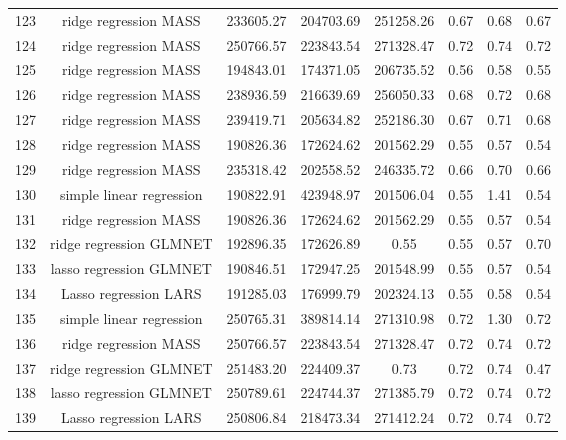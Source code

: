 \begin{tabular}{cccccccc}
  123 & ridge regression MASS & 233605.27 & 204703.69 & 251258.26 & 0.67 & 0.68 & 0.67 \\ 
  124 & ridge regression MASS & 250766.57 & 223843.54 & 271328.47 & 0.72 & 0.74 & 0.72 \\ 
  125 & ridge regression MASS & 194843.01 & 174371.05 & 206735.52 & 0.56 & 0.58 & 0.55 \\ 
  126 & ridge regression MASS & 238936.59 & 216639.69 & 256050.33 & 0.68 & 0.72 & 0.68 \\ 
  127 & ridge regression MASS & 239419.71 & 205634.82 & 252186.30 & 0.67 & 0.71 & 0.68 \\ 
  128 & ridge regression MASS & 190826.36 & 172624.62 & 201562.29 & 0.55 & 0.57 & 0.54 \\ 
  129 & ridge regression MASS & 235318.42 & 202558.52 & 246335.72 & 0.66 & 0.70 & 0.66 \\ 
  130 & simple linear regression & 190822.91 & 423948.97 & 201506.04 & 0.55 & 1.41 & 0.54 \\ 
  131 & ridge regression MASS & 190826.36 & 172624.62 & 201562.29 & 0.55 & 0.57 & 0.54 \\ 
  132 & ridge regression GLMNET & 192896.35 & 172626.89 & 0.55 & 0.55 & 0.57 & 0.70 \\ 
  133 & lasso regression GLMNET & 190846.51 & 172947.25 & 201548.99 & 0.55 & 0.57 & 0.54 \\ 
  134 & Lasso regression LARS & 191285.03 & 176999.79 & 202324.13 & 0.55 & 0.58 & 0.54 \\ 
  135 & simple linear regression & 250765.31 & 389814.14 & 271310.98 & 0.72 & 1.30 & 0.72 \\ 
  136 & ridge regression MASS & 250766.57 & 223843.54 & 271328.47 & 0.72 & 0.74 & 0.72 \\ 
  137 & ridge regression GLMNET & 251483.20 & 224409.37 & 0.73 & 0.72 & 0.74 & 0.47 \\ 
  138 & lasso regression GLMNET & 250789.61 & 224744.37 & 271385.79 & 0.72 & 0.74 & 0.72 \\ 
  139 & Lasso regression LARS & 250806.84 & 218473.34 & 271412.24 & 0.72 & 0.74 & 0.72 \\ 
   \hline
\end{tabular}

